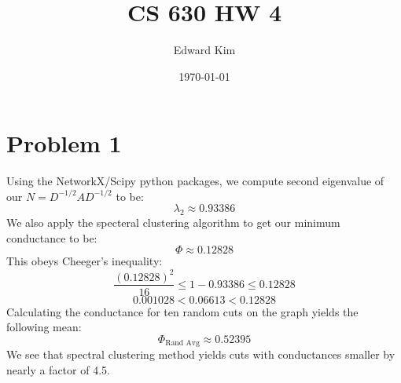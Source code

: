 \documentclass[12pt]{article}%
\begin{document}
\title{CS 630 HW 4}
\author{Edward Kim}
\date{\today}
\maketitle

\section*{Problem 1}
Using the NetworkX/Scipy python packages, we compute second eigenvalue of our $N = D^{-1/2}AD^{-1/2}$ to be:
$$\lambda_2 \approx 0.93386 $$
We also apply the specteral clustering algorithm to get our minimum conductance to be:
$$ \Phi \approx 0.12828$$
This obeys Cheeger's inequality:
$$ \frac{(0.12828)^2}{16} \leq 1 - 0.93386 \leq  0.12828$$
$$ 0.001028 < 0.06613 < 0.12828$$
Calculating the conductance for ten random cuts on the graph yields the following mean:
$$ \Phi_{\text{Rand Avg}} \approx 0.52395$$
We see that spectral clustering method yields cuts with conductances smaller by nearly a factor of 4.5.
\end{document}
